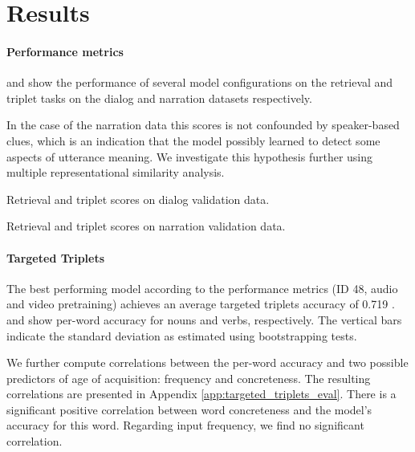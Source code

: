\section{Results}
\label{sec:results}
\paragraph{Performance metrics}
 and  show
the performance of several model configurations on the retrieval and
triplet tasks on the dialog and narration datasets respectively.

In the case of the narration data this scores is not confounded by
speaker-based clues, which is an indication that the model possibly
learned to detect some aspects of utterance meaning. We investigate
this hypothesis further using multiple representational similarity
analysis.
 

 \begin{table}
   \centering
   
   \caption{Retrieval and triplet scores on dialog validation data.}
   \label{tab:scores-dialog}
 \end{table}

\begin{table}
   \centering
   
   \caption{Retrieval and triplet scores on narration validation data.}
   \label{tab:scores-narration}
 \end{table}
 
\paragraph{Targeted Triplets}

The best performing model according to the
performance metrics (ID 48, audio and video pretraining) achieves an average
targeted triplets accuracy of 0.719 .  and
 show per-word
accuracy for nouns and verbs, respectively. The vertical
bars indicate the standard deviation as estimated using bootstrapping
tests.

We further compute correlations between the per-word accuracy and two possible predictors of age of acquisition: frequency and concreteness. The resulting correlations are presented in Appendix \ref{app:targeted_triplets_eval}. There is a significant positive correlation between word concreteness and the model's accuracy for this word. Regarding input frequency, we find no significant correlation.

